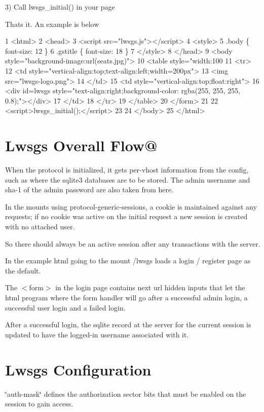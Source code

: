 3) Call lwsgs\+\_\+initial() in your page

That\textquotesingle{}s it. An example is below


\begin{DoxyCode}
1 <html>
2  <head>
3   <script src="lwsgs.js"></script>
4   <style>
5      .body \{ font-size: 12 \}
6      .gstitle \{ font-size: 18 \}
7   </style>
8   </head>
9   <body style="background-image:url(seats.jpg)">
10     <table style="width:100%
11      <tr>
12       <td style="vertical-align:top;text-align:left;width=200px">
13        <img src="lwsgs-logo.png">
14       </td>
15       <td style="vertical-align:top;float:right">
16         <div id=lwsgs style="text-align:right;background-color: rgba(255, 255, 255, 0.8);"></div>
17       </td>
18      </tr>
19     </table>
20    </form>
21 
22    <script>lwsgs\_initial();</script>
23 
24  </body>
25 </html>
\end{DoxyCode}
\hypertarget{md_README.generic-sessions_gsof}{}\section{Lwsgs Overall Flow@}\label{md_README.generic-sessions_gsof}
When the protocol is initialized, it gets per-\/vhost information from the config, such as where the sqlite3 databases are to be stored. The admin username and sha-\/1 of the admin password are also taken from here.

In the mounts using protocol-\/generic-\/sessions, a cookie is maintained against any requests; if no cookie was active on the initial request a new session is created with no attached user.

So there should always be an active session after any transactions with the server.

In the example html going to the mount /lwsgs loads a login / register page as the default.

The $<$form$>$ in the login page contains \textquotesingle{}next url\textquotesingle{} hidden inputs that let the html \textquotesingle{}program\textquotesingle{} where the form handler will go after a successful admin login, a successful user login and a failed login.

After a successful login, the sqlite record at the server for the current session is updated to have the logged-\/in username associated with it.\hypertarget{md_README.generic-sessions_gsconf}{}\section{Lwsgs Configuration}\label{md_README.generic-sessions_gsconf}
\char`\"{}auth-\/mask\char`\"{} defines the authorization sector bits that must be enabled on the session to gain access.

